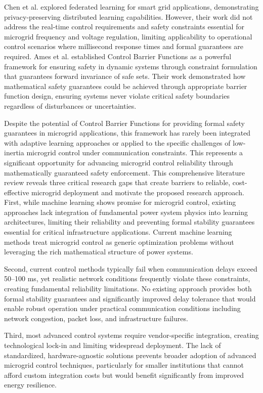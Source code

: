 \documentclass[12pt]{article}
\begin{document}
Chen et al. \cite{chen2021} explored federated learning for smart grid applications, demonstrating privacy-preserving distributed learning capabilities. However, their work did not address the real-time control requirements and safety constraints essential for microgrid frequency and voltage regulation, limiting applicability to operational control scenarios where millisecond response times and formal guarantees are required. Ames et al. \cite{ames2019} established Control Barrier Functions as a powerful framework for ensuring safety in dynamic systems through constraint formulation that guarantees forward invariance of safe sets. Their work demonstrated how mathematical safety guarantees could be achieved through appropriate barrier function design, ensuring systems never violate critical safety boundaries regardless of disturbances or uncertainties.

Despite the potential of Control Barrier Functions for providing formal safety guarantees in microgrid applications, this framework has rarely been integrated with adaptive learning approaches or applied to the specific challenges of low-inertia microgrid control under communication constraints. This represents a significant opportunity for advancing microgrid control reliability through mathematically guaranteed safety enforcement. This comprehensive literature review reveals three critical research gaps that create barriers to reliable, cost-effective microgrid deployment and motivate the proposed research approach. First, while machine learning shows promise for microgrid control, existing approaches lack integration of fundamental power system physics into learning architectures, limiting their reliability and preventing formal stability guarantees essential for critical infrastructure applications. Current machine learning methods treat microgrid control as generic optimization problems without leveraging the rich mathematical structure of power systems.

Second, current control methods typically fail when communication delays exceed 50--100 ms, yet realistic network conditions frequently violate these constraints, creating fundamental reliability limitations. No existing approach provides both formal stability guarantees and significantly improved delay tolerance that would enable robust operation under practical communication conditions including network congestion, packet loss, and infrastructure failures.

Third, most advanced control systems require vendor-specific integration, creating technological lock-in and limiting widespread deployment. The lack of standardized, hardware-agnostic solutions prevents broader adoption of advanced microgrid control techniques, particularly for smaller institutions that cannot afford custom integration costs but would benefit significantly from improved energy resilience.
\end{document}
